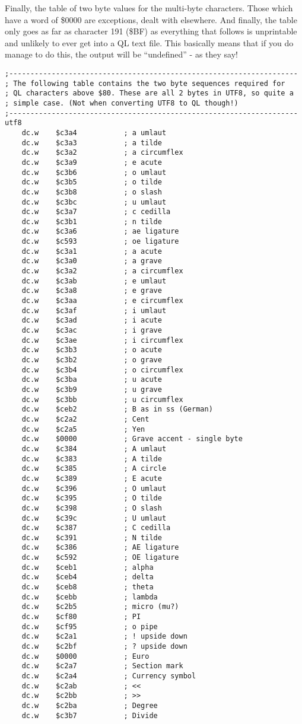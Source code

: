 Finally, the table of two byte values for the multi-byte characters.
Those which have a word of \$0000 are exceptions, dealt with elsewhere.
And finally, the table only goes as far as character 191 (\$BF) as
everything that follows is unprintable and unlikely to ever get into
a QL text file. This basically means that if you do manage to do this,
the output will be ``undefined'' - as they say!

\begin{lstlisting}
;--------------------------------------------------------------------
; The following table contains the two byte sequences required for 
; QL characters above $80. These are all 2 bytes in UTF8, so quite a 
; simple case. (Not when converting UTF8 to QL though!)
;--------------------------------------------------------------------
utf8
    dc.w    $c3a4           ; a umlaut
    dc.w    $c3a3           ; a tilde
    dc.w    $c3a2           ; a circumflex
    dc.w    $c3a9           ; e acute
    dc.w    $c3b6           ; o umlaut
    dc.w    $c3b5           ; o tilde
    dc.w    $c3b8           ; o slash
    dc.w    $c3bc           ; u umlaut
    dc.w    $c3a7           ; c cedilla
    dc.w    $c3b1           ; n tilde
    dc.w    $c3a6           ; ae ligature
    dc.w    $c593           ; oe ligature
    dc.w    $c3a1           ; a acute
    dc.w    $c3a0           ; a grave
    dc.w    $c3a2           ; a circumflex
    dc.w    $c3ab           ; e umlaut
    dc.w    $c3a8           ; e grave
    dc.w    $c3aa           ; e circumflex
    dc.w    $c3af           ; i umlaut
    dc.w    $c3ad           ; i acute
    dc.w    $c3ac           ; i grave
    dc.w    $c3ae           ; i circumflex
    dc.w    $c3b3           ; o acute
    dc.w    $c3b2           ; o grave
    dc.w    $c3b4           ; o circumflex
    dc.w    $c3ba           ; u acute
    dc.w    $c3b9           ; u grave
    dc.w    $c3bb           ; u circumflex
    dc.w    $ceb2           ; B as in ss (German)
    dc.w    $c2a2           ; Cent
    dc.w    $c2a5           ; Yen
    dc.w    $0000           ; Grave accent - single byte
    dc.w    $c384           ; A umlaut
    dc.w    $c383           ; A tilde
    dc.w    $c385           ; A circle
    dc.w    $c389           ; E acute
    dc.w    $c396           ; O umlaut
    dc.w    $c395           ; O tilde
    dc.w    $c398           ; O slash
    dc.w    $c39c           ; U umlaut
    dc.w    $c387           ; C cedilla
    dc.w    $c391           ; N tilde
    dc.w    $c386           ; AE ligature
    dc.w    $c592           ; OE ligature
    dc.w    $ceb1           ; alpha
    dc.w    $ceb4           ; delta
    dc.w    $ceb8           ; theta
    dc.w    $cebb           ; lambda
    dc.w    $c2b5           ; micro (mu?)
    dc.w    $cf80           ; PI
    dc.w    $cf95           ; o pipe
    dc.w    $c2a1           ; ! upside down
    dc.w    $c2bf           ; ? upside down
    dc.w    $0000           ; Euro
    dc.w    $c2a7           ; Section mark
    dc.w    $c2a4           ; Currency symbol
    dc.w    $c2ab           ; <<
    dc.w    $c2bb           ; >>
    dc.w    $c2ba           ; Degree
    dc.w    $c3b7           ; Divide
\end{lstlisting}

